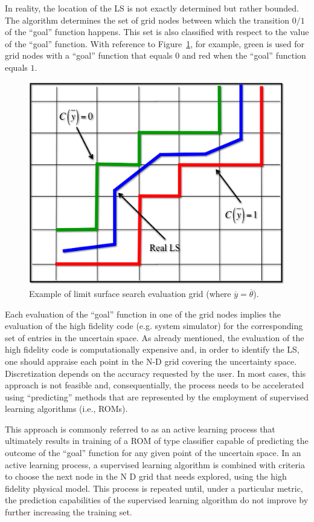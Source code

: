 In reality, the location of the LS is not exactly determined but rather 
bounded. The algorithm determines the set of grid nodes between 
which the transition $0/1$ of the ``goal'' function happens. This set is 
also classified with respect to the value of the ``goal'' function. With 
reference to Figure~\ref{fig:LSgoalFunctionExample}, for example, 
green is used for grid nodes with a 
``goal'' function that equals $0$ and red when the ``goal'' function 
equals $1$.
\begin{figure}[h!]
  \centering
  \includegraphics[width=1.0\textwidth]  {pics/LSgoalFunctionExample.png}
  \caption{Example of limit surface search evaluation grid (where $\overline{y}=\overline{\theta}$).}
  \label{fig:LSgoalFunctionExample}
\end{figure}
Each evaluation of the ``goal'' function in one of the grid nodes implies 
the evaluation of the high fidelity code (e.g. system simulator) for the 
corresponding set of entries in the uncertain space. As already 
mentioned, the evaluation of the high fidelity code is computationally 
expensive and, in order to identify the LS, one should appraise 
each point in the N-D grid covering the uncertainty space. 
Discretization depends on the accuracy requested by the user. In 
most cases, this approach is not feasible and, consequentially, the 
process needs to be accelerated using ``predicting'' methods that are 
represented by the employment of supervised learning algorithms 
(i.e., ROMs).

This approach is commonly referred to as an active learning process 
that ultimately results in training of a ROM of type classifier capable of 
predicting the outcome of the ``goal'' function for any given point of 
the uncertain space.
In an active learning process, a supervised learning algorithm is 
combined with criteria to choose the next node in the N D grid that 
needs explored, using the high fidelity physical model. This process is 
repeated until, under a particular metric, the prediction capabilities of 
the supervised learning algorithm do not improve by further increasing 
the training set.

